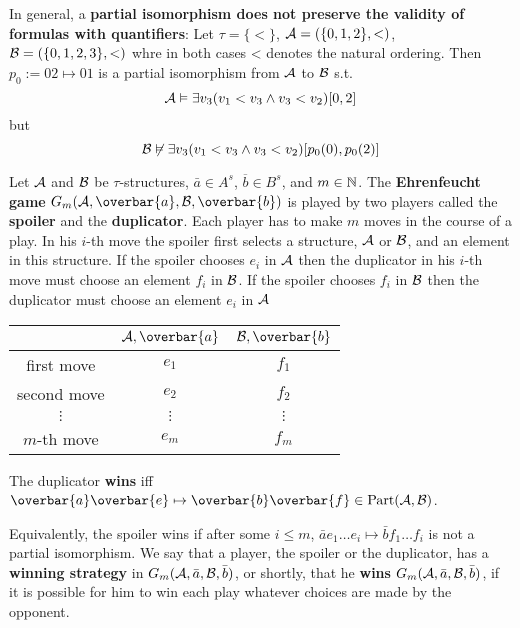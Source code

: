 \documentclass[11pt]{article}
\def \Part {\text{Part}}
\begin{document}
In general, a \textbf{partial isomorphism does not preserve the validity of formulas with quantifiers}:
Let \(\tau=\{<\}\), \(\mathcal{A}=(\{0,1,2\},<)\), \(\mathcal{B}=(\{0,1,2,3\},<)\) whre in both cases <
denotes the natural ordering. Then \(p_0:=02\mapsto 01\) is a partial isomorphism from \(\mathcal{A}\)
to \(\mathcal{B}\) s.t.
\begin{equation*}
\mathcal{A}\vDash\exists v_3(v_1<v_3\wedge v_3<v_2)[0,2]
\end{equation*}
but
\begin{equation*}
\mathcal{B}\not\vDash\exists v_3(v_1<v_3\wedge v_3<v_2)[p_0(0),p_0(2)]
\end{equation*}



Let \(\mathcal{A}\) and \(\mathcal{B}\) be \(\tau\)-structures, \(\bar{a}\in A^s\),
\(\overbar{b}\in B^s\), and \(m\in\mathbb{N}\). The \textbf{Ehrenfeucht game}
\(G_m(\cala,\overbar{a},\calb,\overbar{b})\) is played by two players called
the \textbf{spoiler} and the \textbf{duplicator}. Each player has to make \(m\) moves in
the course of a play. In his \(i\)-th move the spoiler first selects a
structure, \(\mathcal{A}\) or \(\mathcal{B}\), and an element in this structure. If the
spoiler chooses \(e_i\) in \(\mathcal{A}\) then the duplicator in his \(i\)-th move
must choose an element \(f_i\) in \(\mathcal{B}\). If the spoiler chooses \(f_i\)
in \(\mathcal{B}\) then the duplicator must choose an element \(e_i\) in \(\mathcal{A}\)

\begin{center}
\begin{tabular}{cc|c}
 & \(\cala,\overbar{a}\) & \(\calb,\overbar{b}\)\\
\hline
first move & \(e_1\) & \(f_1\)\\
second move & \(e_2\) & \(f_2\)\\
\(\vdots\) & \(\vdots\) & \(\vdots\)\\
\(m\)-th move & \(e_m\) & \(f_m\)\\
\end{tabular}
\end{center}

The duplicator \textbf{wins} iff
\(\overbar{a}\overbar{e}\mapsto\overbar{b}\overbar{f}\in\Part(\cala,\calb)\).

Equivalently, the spoiler wins if after
some \(i\le m\), \(\bar{a}e_1\dots e_i\mapsto\bar{b}f_1\dots f_i\) is not a partial isomorphism.
We say that a player, the spoiler or the duplicator, has a \textbf{winning strategy}
in \(G_m(\mathcal{A},\bar{a},\mathcal{B},\bar{b})\), or shortly, that he
\textbf{wins} \(G_m(\mathcal{A},\bar{a},\mathcal{B},\bar{b})\), if it is possible for him to win each play whatever
choices are made by the opponent.
\end{document}
